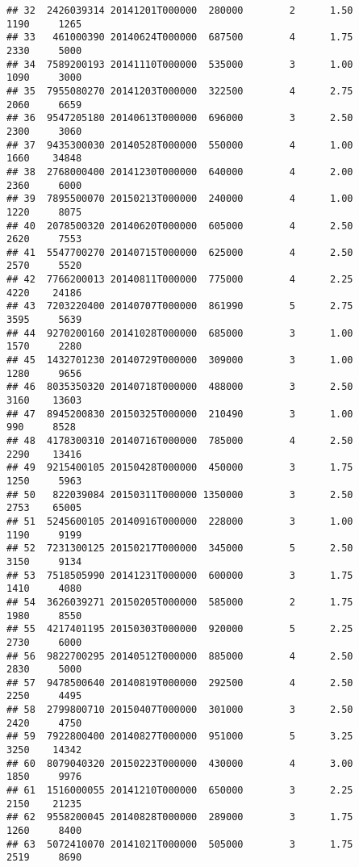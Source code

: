 \documentclass[
]{article}
\begin{document}
\begin{verbatim}
## 32  2426039314 20141201T000000  280000        2      1.50        1190     1265
## 33   461000390 20140624T000000  687500        4      1.75        2330     5000
## 34  7589200193 20141110T000000  535000        3      1.00        1090     3000
## 35  7955080270 20141203T000000  322500        4      2.75        2060     6659
## 36  9547205180 20140613T000000  696000        3      2.50        2300     3060
## 37  9435300030 20140528T000000  550000        4      1.00        1660    34848
## 38  2768000400 20141230T000000  640000        4      2.00        2360     6000
## 39  7895500070 20150213T000000  240000        4      1.00        1220     8075
## 40  2078500320 20140620T000000  605000        4      2.50        2620     7553
## 41  5547700270 20140715T000000  625000        4      2.50        2570     5520
## 42  7766200013 20140811T000000  775000        4      2.25        4220    24186
## 43  7203220400 20140707T000000  861990        5      2.75        3595     5639
## 44  9270200160 20141028T000000  685000        3      1.00        1570     2280
## 45  1432701230 20140729T000000  309000        3      1.00        1280     9656
## 46  8035350320 20140718T000000  488000        3      2.50        3160    13603
## 47  8945200830 20150325T000000  210490        3      1.00         990     8528
## 48  4178300310 20140716T000000  785000        4      2.50        2290    13416
## 49  9215400105 20150428T000000  450000        3      1.75        1250     5963
## 50   822039084 20150311T000000 1350000        3      2.50        2753    65005
## 51  5245600105 20140916T000000  228000        3      1.00        1190     9199
## 52  7231300125 20150217T000000  345000        5      2.50        3150     9134
## 53  7518505990 20141231T000000  600000        3      1.75        1410     4080
## 54  3626039271 20150205T000000  585000        2      1.75        1980     8550
## 55  4217401195 20150303T000000  920000        5      2.25        2730     6000
## 56  9822700295 20140512T000000  885000        4      2.50        2830     5000
## 57  9478500640 20140819T000000  292500        4      2.50        2250     4495
## 58  2799800710 20150407T000000  301000        3      2.50        2420     4750
## 59  7922800400 20140827T000000  951000        5      3.25        3250    14342
## 60  8079040320 20150223T000000  430000        4      3.00        1850     9976
## 61  1516000055 20141210T000000  650000        3      2.25        2150    21235
## 62  9558200045 20140828T000000  289000        3      1.75        1260     8400
## 63  5072410070 20141021T000000  505000        3      1.75        2519     8690

\end{verbatim}
\end{document}
